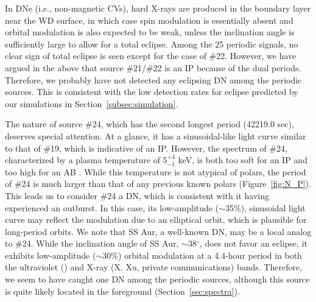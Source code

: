 \documentclass[fleqn,usenatbib]{mnras}
\begin{document}
In DNe (i.e., non-magnetic CVs), hard X-rays are produced in the boundary layer near the WD surface, in which case spin modulation is essentially absent and orbital modulation is also expected to be weak, unless the inclination angle is sufficiently large to allow for a total eclipse. Among the 25 periodic signals, no clear sign of total eclipse is seen except for the case of \#22. However, we have argued in the above that source \#21/\#22 is an IP because of the dual periods. Therefore, we probably have not detected any eclipsing DN among the periodic sources. This is consistent with the low detection rates for eclipse predicted by our simulations in Section~\ref{subsec:simulation}. 

The nature of source \#24, which has the second longest period (42219.0 sec), deserves special attention. At a glance, it has a sinusoidal-like light curve similar to that of \#19, which is indicative of an IP. However, the spectrum of \#24, characterized by a plasma temperature of $5^{+4}_{-1}$ keV, is both too soft for an IP \citep{2016ApJ...818..136X}
and too high for an AB \citep{2004A&ARv..12...71G}. 
While this temperature is not atypical of polars, the period of \#24 is much larger than that of any previous known polars (Figure~\ref{fig:N_P}). 
This leads us to consider \#24 a DN, which is consistent with it having experienced an outburst.  In this case, its low-amplitude ($\sim$35\%), sinusoidal light curve may reflect the modulation due to an elliptical orbit, which is plausible for long-period orbits. 
We note that SS Aur, a well-known DN, may be a local analog to \#24. 
While the inclination angle of SS Aur,  $\sim$38$^\circ$, does not favor an eclipse, it exhibits low-amplitude ($\sim30\%$) orbital modulation at a 4.4-hour period in both the ultraviolet  (\citealt{1983ApJ...271..754W,1986Afz....24..227E}) and X-ray (X. Xu, private communications) bands.
Therefore, we seem to have caught one DN among the periodic sources, although this source is quite likely located in the foreground (Section~\ref{sec:spectra}).
\end{document}
